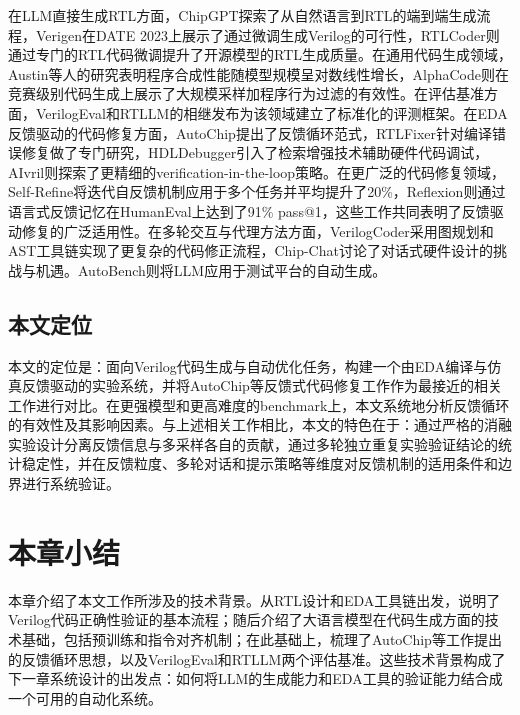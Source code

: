 在LLM直接生成RTL方面，ChipGPT\cite{chipgpt}探索了从自然语言到RTL的端到端生成流程，Verigen\cite{thakur2023verigen}在DATE 2023上展示了通过微调生成Verilog的可行性，RTLCoder\cite{rtlcoder}则通过专门的RTL代码微调提升了开源模型的RTL生成质量。在通用代码生成领域，Austin等人\cite{mbpp}的研究表明程序合成性能随模型规模呈对数线性增长，AlphaCode\cite{alphacode}则在竞赛级别代码生成上展示了大规模采样加程序行为过滤的有效性。在评估基准方面，VerilogEval\cite{verilogeval}和RTLLM\cite{rtllm}的相继发布为该领域建立了标准化的评测框架。在EDA反馈驱动的代码修复方面，AutoChip\cite{autochip}提出了反馈循环范式，RTLFixer\cite{rtlfixer}针对编译错误修复做了专门研究，HDLDebugger\cite{hdldebugger}引入了检索增强技术辅助硬件代码调试，AIvril\cite{aivril}则探索了更精细的verification-in-the-loop策略。在更广泛的代码修复领域，Self-Refine\cite{selfrefine}将迭代自反馈机制应用于多个任务并平均提升了20\%，Reflexion\cite{reflexion}则通过语言式反馈记忆在HumanEval上达到了91\% pass@1，这些工作共同表明了反馈驱动修复的广泛适用性。在多轮交互与代理方法方面，VerilogCoder\cite{verilogcoder}采用图规划和AST工具链实现了更复杂的代码修正流程，Chip-Chat\cite{chipchat}讨论了对话式硬件设计的挑战与机遇。AutoBench\cite{autobench}则将LLM应用于测试平台的自动生成。

\subsection{本文定位}

本文的定位是：面向Verilog代码生成与自动优化任务，构建一个由EDA编译与仿真反馈驱动的实验系统，并将AutoChip等反馈式代码修复工作作为最接近的相关工作进行对比。在更强模型和更高难度的benchmark上，本文系统地分析反馈循环的有效性及其影响因素。与上述相关工作相比，本文的特色在于：通过严格的消融实验设计分离反馈信息与多采样各自的贡献，通过多轮独立重复实验验证结论的统计稳定性，并在反馈粒度、多轮对话和提示策略等维度对反馈机制的适用条件和边界进行系统验证。

\section{本章小结}

本章介绍了本文工作所涉及的技术背景。从RTL设计和EDA工具链出发，说明了Verilog代码正确性验证的基本流程；随后介绍了大语言模型在代码生成方面的技术基础，包括预训练和指令对齐机制；在此基础上，梳理了AutoChip等工作提出的反馈循环思想，以及VerilogEval和RTLLM两个评估基准。这些技术背景构成了下一章系统设计的出发点：如何将LLM的生成能力和EDA工具的验证能力结合成一个可用的自动化系统。
